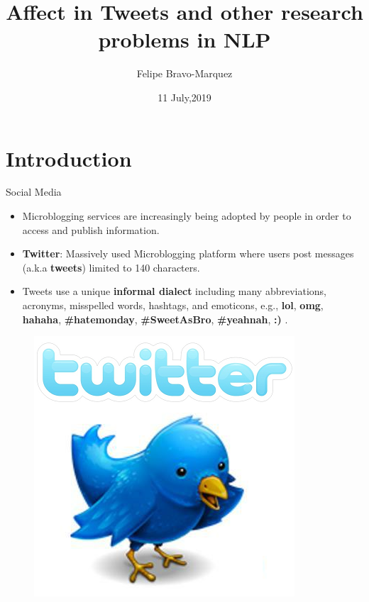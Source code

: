 \documentclass[handout]{beamer}
\title{Affect in Tweets and other research problems in NLP}
\author[Felipe Bravo Márquez]{Felipe Bravo-Marquez}
\institute{Department of Computer Science, University of Chile \& IMFD }
\date{11 July,2019}
\begin{document}
\begin{frame}
\titlepage


\end{frame}

\section{Introduction}

\begin{frame}{Social Media}
\begin{scriptsize}
\begin{itemize}
 \item Microblogging services are increasingly being adopted by people in order to access and publish information.  
 \item \textbf{Twitter}: Massively used Microblogging platform where users post messages (a.k.a \textbf{tweets}) limited to 140 characters. 
 \item Tweets use a unique \textbf{informal dialect} including many abbreviations, acronyms, misspelled words, hashtags, and emoticons, e.g., \textbf{lol}, \textbf{omg}, \textbf{hahaha}, \textbf{\#hatemonday}, \textbf{\#SweetAsBro}, \textbf{\#yeahnah}, \textbf{:)} .
\end{itemize}
  \begin{figure}[h]
        	\includegraphics[scale = 0.2]{pics/twitter.png}
        \end{figure}

\end{scriptsize}
\end{frame}
\end{document}
